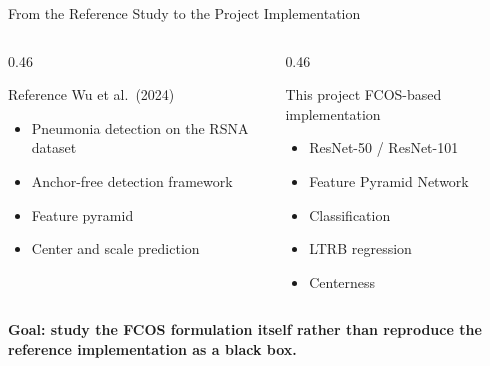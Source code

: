\documentclass[aspectratio=169,11pt]{beamer}
\begin{document}
\begin{frame}{From the Reference Study to the Project Implementation}

\begin{columns}

\begin{column}{0.46\textwidth}

\begin{block}{Reference}
Wu et al.~(2024)
\end{block}

\vspace{0.3cm}

\begin{itemize}
    \item Pneumonia detection on the RSNA dataset
    \item Anchor-free detection framework
    \item Feature pyramid
    \item Center and scale prediction
\end{itemize}

\end{column}

\begin{column}{0.46\textwidth}

\begin{block}{This project}
FCOS-based implementation
\end{block}

\vspace{0.3cm}

\begin{itemize}
    \item ResNet-50 / ResNet-101
    \item Feature Pyramid Network
    \item Classification
    \item LTRB regression
    \item Centerness
\end{itemize}

\end{column}

\end{columns}

\vspace{0.5cm}

\centering
\textbf{
Goal: study the FCOS formulation itself rather than reproduce the
reference implementation as a black box.
}

\end{frame}
\end{document}
